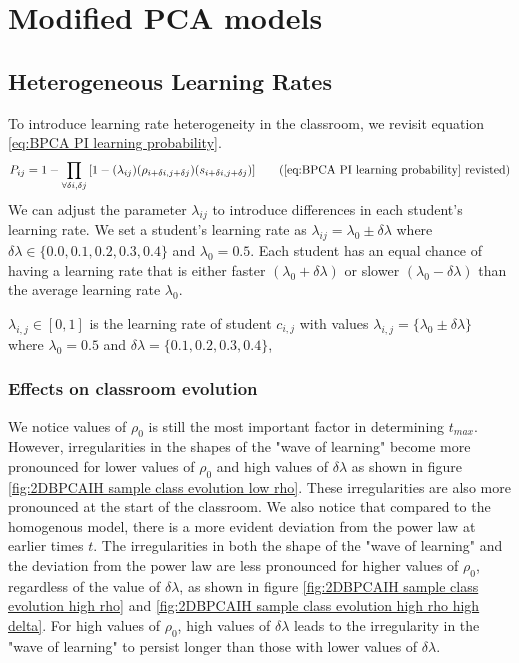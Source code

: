\chapter{Modified PCA models}

\section{Heterogeneous Learning Rates}
To introduce learning rate heterogeneity in the classroom, we revisit equation \ref{eq:BPCA PI learning probability}. 
\begin{equation*}
    P_{ij} = 1 - \prod_{\forall \delta i, \delta j}{\lbrack1-(\lambda_{ij})(\rho_{i+\delta i, j+\delta j})(s_{i+\delta i, j+\delta j})}\rbrack
    \tag{\ref{eq:BPCA PI learning probability} revisted}
\end{equation*}
We can adjust the parameter $\lambda_{ij}$ to introduce differences in each student's learning rate. 
We set a student's learning rate as $\lambda_{ij} = \lambda_0 \pm \delta\lambda$ where $\delta\lambda \in \lbrace 0.0,0.1, 0.2, 0.3, 0.4\rbrace$ and $\lambda_0 = 0.5$. 
Each student has an equal chance of having a learning rate that is either faster $(\lambda_0 + \delta\lambda)$ or slower $(\lambda_0 - \delta\lambda)$ than the average learning rate $\lambda_0$. 

$\lambda_{i,j} \in [0,1]$ is the learning rate of student $c_{i,j}$ with values $\lambda_{i,j} = \lbrace \lambda_0 \pm \delta \lambda \rbrace$ where $\lambda_0 = 0.5$ and $\delta \lambda = \lbrace 0.1, 0.2, 0.3, 0.4 \rbrace$, 

\subsection{Effects on classroom evolution}\label{subsec:BPCAIH effects on classroom evolution}
We notice values of $\rho_0$ is still the most important factor in determining $t_{max}$. 
However, irregularities in the shapes of the "wave of learning" become more pronounced for lower values of $\rho_0$ and high values of $\delta\lambda$ as shown in figure \ref{fig:2DBPCAIH sample class evolution low rho}.
These irregularities are also more pronounced at the start of the classroom.
We also notice that compared to the homogenous model, there is a more evident deviation from the power law at earlier times $t$.
The irregularities in both the shape of the "wave of learning" and the deviation from the power law are less pronounced for higher values of $\rho_0$, regardless of the value of $\delta\lambda$, as shown in figure \ref{fig:2DBPCAIH sample class evolution high rho} and \ref{fig:2DBPCAIH sample class evolution high rho high delta}.
For high values of $\rho_0$, high values of $\delta\lambda$ leads to the irregularity in the "wave of learning" to persist longer than those with lower values of $\delta\lambda$.

